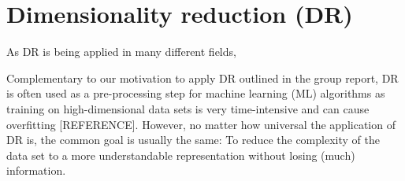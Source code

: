 \documentclass[journal, a4paper]{IEEEtran}
\begin{document}
\section{Dimensionality reduction (DR)}




As DR is being applied in many different fields, 

Complementary to our motivation to apply DR outlined in the group report, DR is often used as a pre-processing step for machine learning (ML) algorithms as training on high-dimensional data sets is very time-intensive and can cause overfitting [REFERENCE]. However, no matter how universal the application of DR is, the common goal is usually the same: To reduce the complexity of the data set to a more understandable representation without losing (much) information. \\



%
\end{document}

